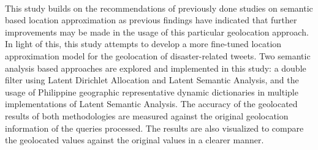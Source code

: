 \begin{thesisabstract}
\paragraph{         }
This study builds on the recommendations of previously done studies on semantic based location approximation as previous findings have indicated that further improvements may be made in the usage of this particular geolocation approach. In light of this, this study attempts to develop a more fine-tuned location approximation model for the geolocation of disaster-related tweets. Two semantic analysis based approaches are explored and implemented in this study: a double filter using Latent Dirichlet Allocation and Latent Semantic Analysis, and the usage of Philippine geographic representative dynamic dictionaries in multiple implementations of Latent Semantic Analysis. The accuracy of the geolocated results of both methodologies are measured against the original geolocation information of the queries processed. The results are also visualized to compare the geolocated values against the original values in a clearer manner.
\end{thesisabstract}